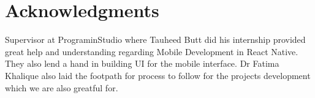 \chapter*{Acknowledgments}

Supervisor at PrograminStudio where Tauheed Butt did his internship provided great help and understanding regarding Mobile Development in React
Native. They also lend a hand in building UI for the mobile interface. Dr Fatima Khalique also laid the footpath for process to follow for the projects development which we are also greatful for.

\vspace{10mm}



